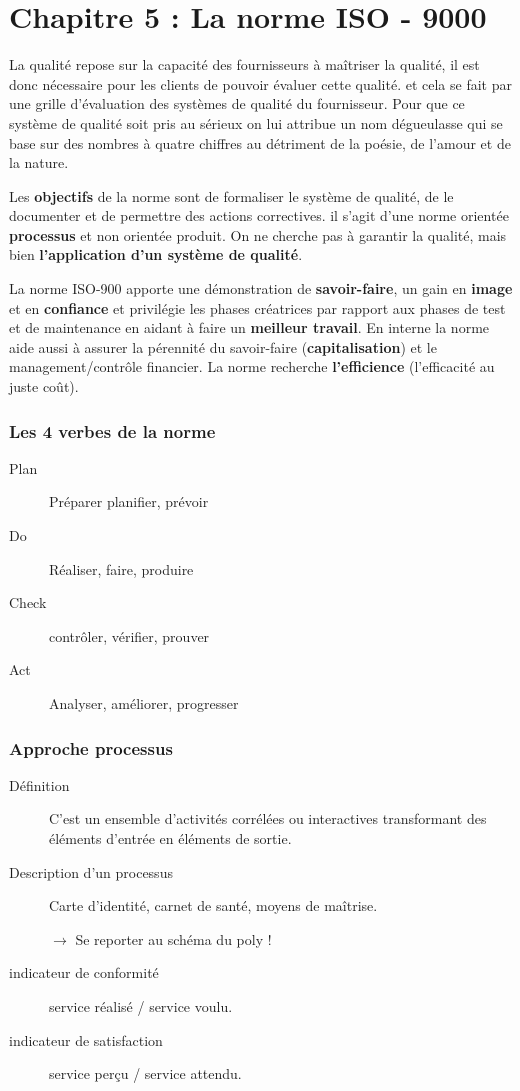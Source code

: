 \part{Chapitre 5 : La norme ISO - 9000}

La qualité repose sur la capacité des fournisseurs à maîtriser la qualité, il est donc nécessaire pour les clients de pouvoir évaluer cette qualité. et cela se fait par une grille d’évaluation des systèmes de qualité du fournisseur. Pour que ce système de qualité soit pris au sérieux on lui attribue un nom dégueulasse qui se base sur des nombres à quatre chiffres au détriment de la poésie, de l’amour et de la nature. %

Les \textbf{objectifs} de la norme sont de formaliser le système de qualité, de le documenter et de permettre des actions correctives. il s’agit d’une norme orientée \textbf{processus} et non orientée produit. On ne cherche pas à garantir la qualité, mais bien \textbf{l’application d’un système de qualité}.

La norme ISO-900 apporte une démonstration de \textbf{savoir-faire}, un gain en \textbf{image} et en \textbf{confiance} et privilégie les phases créatrices par rapport aux phases de test et de maintenance en aidant à faire un \textbf{meilleur travail}. En interne la norme aide aussi à assurer la pérennité du savoir-faire (\textbf{capitalisation}) et le management/contrôle financier. La norme recherche \textbf{l'efficience} (l'efficacité au juste coût).

\section{Les 4 verbes de la norme}
\begin{description}
	\item[Plan] Préparer planifier, prévoir
	\item[Do] Réaliser, faire, produire
	\item[Check] contrôler, vérifier, prouver
	\item[Act] Analyser, améliorer, progresser
\end{description}



\section{Approche processus}
\begin{description}
	\item[Définition] C’est un ensemble d'activités corrélées ou interactives transformant des éléments d'entrée en éléments de sortie.
	\item[Description d’un processus] Carte d'identité, carnet de santé, moyens de maîtrise.

$\rightarrow$ Se reporter au schéma du poly !

\item[indicateur de conformité] service réalisé / service voulu.
\item[indicateur de satisfaction] service perçu / service attendu.
\end{description}


